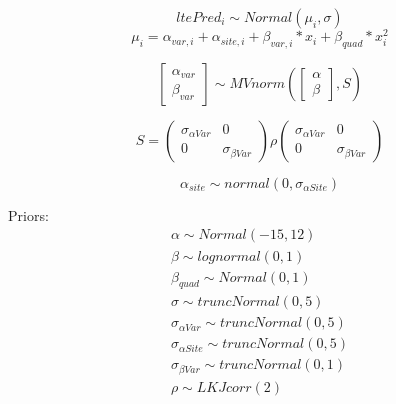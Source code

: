 \documentclass[11pt,letter]{article}
\begin{document}
\begin{equation*}
ltePred_{i} \sim Normal(\mu_{i}, \sigma ) 
\end{equation*}
\begin{equation*}
\mu_{i} = \alpha_{var,i} + \alpha_{site, i}+ \beta_{var, i}\ast x_{i} + \beta_{quad} \ast x^{2}_{i}
\end{equation*}

\begin{equation*}
\begin{bmatrix}
\alpha_{var} \\
\beta_{var}
\end{bmatrix}
\sim MVnorm
\left(
\begin{bmatrix}
\alpha \\
\beta
\end{bmatrix}
,S
\right)
\end{equation*}

\begin{equation*}
S = 
\begin{pmatrix}
\sigma_{\alpha Var} & 0 \\
0 & \sigma_{\beta Var} 
\end{pmatrix}
\rho
\begin{pmatrix}
\sigma_{\alpha Var} & 0 \\
0 & \sigma_{\beta Var} 
\end{pmatrix}
\end{equation*}

\begin{equation*}
\alpha_{site} \sim normal(0, \sigma_{\alpha Site}) 
\end{equation*}

Priors:
\begin{gather*}
\alpha \sim Normal(-15, 12)\\
\beta \sim lognormal(0,1)\\
\beta_{quad} \sim Normal(0,1)\\
\sigma \sim truncNormal(0,5)\\
\sigma_{\alpha Var} \sim truncNormal(0,5)\\
\sigma_{\alpha Site} \sim truncNormal(0,5)\\
\sigma_{\beta Var} \sim truncNormal(0,1)\\
\rho \sim LKJcorr (2)
\end{gather*}




\end{document}
